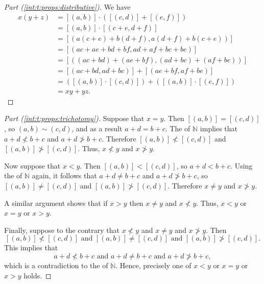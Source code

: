 \begin{proof}[Part (\ref{int:t:props:distributive})]
	We have
	\begin{align*}
		x(y + z) & = [(a, b)] \cdot ([(c, d)] + [(e, f)])                  \\
		         & = [(a, b)] \cdot [(c + e, d + f)]                       \\
		         & = [(a(c + e) + b(d + f), a(d + f) + b(c + e))]          \\
		         & = [(ac + ae + bd + bf, ad + af + bc + be)]              \\
		         & = [((ac + bd) + (ae + bf), (ad + bc) + (af + be))]      \\
		         & = [(ac + bd, ad + bc)] + [(ae + bf, af + be)]           \\
		         & = ([(a, b)] \cdot [(c, d)]) + ([(a, b)] \cdot [(e, f)]) \\
		         & = xy + yz.
	\end{align*}
\end{proof}

\begin{proof}[Part (\ref{int:t:props:trichotomy})]
	Suppose that $x = y$. Then $[(a, b)] = [(c, d)]$, so $(a, b) \sim (c, d)$, and as a result $a + d = b + c$. The  of $\mathbb{N}$ implies that $a + d \nless b + c$ and $a + d \ngtr b + c$. Therefore $[(a, b)] \nless [(c, d)]$ and $[(a, b)] \ngtr [(c, d)]$. Thus, $x \nless y$ and $x \ngtr y$.

	Now suppose that $x < y$. Then $[(a, b)] < [(c, d)]$, so $a + d < b + c$. Using the  of $\mathbb{N}$ again, it follows that
	$a + d \not= b + c$ and $a + d \ngtr b + c$, so ${[(a, b)] \not= [(c, d)]}$ and $[(a, b)] \ngtr [(c, d)]$. Therefore $x \not= y$ and $x \ngtr y$.

	A similar argument shows that if $x > y$ then $x \not= y$ and $x \nless y$.  Thus, $x < y$ or $x = y$ or $x > y$.

	Finally, suppose to the contrary that $x \nless y$ and $x \not= y$ and $x \ngtr y$. Then
	\[
		[(a, b)] \nless [(c, d)] \text{ and } [(a, b)] \not= [(c, d)] \text{ and } [(a, b)] \ngtr [(c, d)].
	\]
	This implies that
	\[
		a + d \nless b + c \text{ and } a + d \not= b + c \text{ and } a + d \ngtr b + c,
	\]
	which is a contradiction to the  of $\mathbb{N}$. Hence, precisely one of $x < y$ or $x = y$ or $x > y$ holds.
\end{proof}

